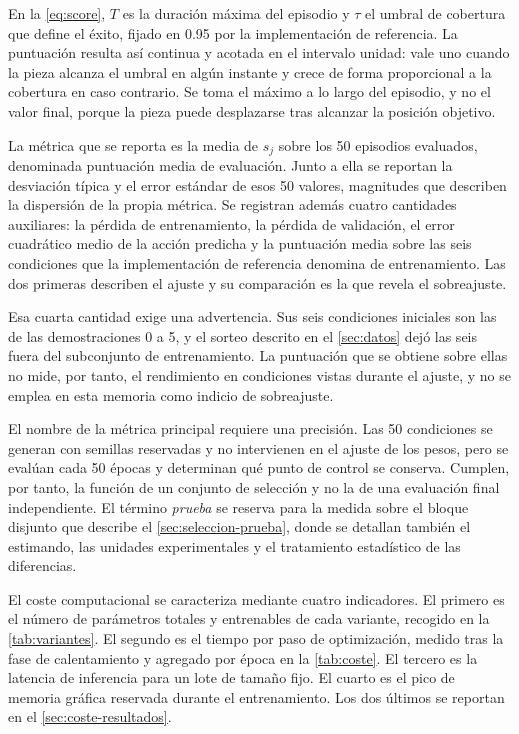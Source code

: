 En la \cref{eq:score}, $T$ es la duraci\'on m\'axima del episodio y $\tau$ el umbral de
cobertura que define el \'exito, fijado en \num{0.95} por la implementaci\'on de
referencia. La puntuaci\'on resulta as\'i continua y acotada en el intervalo unidad: vale
uno cuando la pieza alcanza el umbral en alg\'un instante y crece de forma proporcional a
la cobertura en caso contrario. Se toma el m\'aximo a lo largo del episodio, y no el valor
final, porque la pieza puede desplazarse tras alcanzar la posici\'on objetivo.

La m\'etrica que se reporta es la media de $s_j$ sobre los \num{50} episodios evaluados,
denominada puntuaci\'on media de evaluaci\'on. Junto a ella se reportan la desviaci\'on
t\'ipica y el error est\'andar de esos \num{50} valores, magnitudes que describen la
dispersi\'on de la propia m\'etrica. Se registran adem\'as cuatro cantidades auxiliares:
la p\'erdida de entrenamiento, la p\'erdida de validaci\'on, el error cuadr\'atico medio
de la acci\'on predicha y la puntuaci\'on media sobre las seis condiciones que la
implementaci\'on de referencia denomina de entrenamiento. Las dos primeras describen el
ajuste y su comparaci\'on es la que revela el sobreajuste.

Esa cuarta cantidad exige una advertencia. Sus seis condiciones iniciales son las de las
demostraciones \num{0} a \num{5}, y el sorteo descrito en el \cref{sec:datos} dej\'o las
seis fuera del subconjunto de entrenamiento. La puntuaci\'on que se obtiene sobre ellas no
mide, por tanto, el rendimiento en condiciones vistas durante el ajuste, y no se emplea en
esta memoria como indicio de sobreajuste.

El nombre de la m\'etrica principal requiere una precisi\'on. Las \num{50} condiciones se
generan con semillas reservadas y no intervienen en el ajuste de los pesos, pero se
eval\'uan cada \num{50} \'epocas y determinan qu\'e punto de control se conserva. Cumplen,
por tanto, la funci\'on de un conjunto de selecci\'on y no la de una evaluaci\'on final
independiente. El t\'ermino \textit{prueba} se reserva para la medida sobre el bloque
disjunto que describe el \cref{sec:seleccion-prueba}, donde se detallan tambi\'en el
estimando, las unidades experimentales y el tratamiento estad\'istico de las diferencias.

El coste computacional se caracteriza mediante cuatro indicadores. El primero es el
n\'umero de par\'ametros totales y entrenables de cada variante, recogido en la
\cref{tab:variantes}. El segundo es el tiempo por paso de optimizaci\'on, medido tras la
fase de calentamiento y agregado por \'epoca en la \cref{tab:coste}. El tercero es la
latencia de inferencia para un lote de tama\~no fijo. El cuarto es el pico de memoria
gr\'afica reservada durante el entrenamiento. Los dos \'ultimos se reportan en el
\cref{sec:coste-resultados}.

